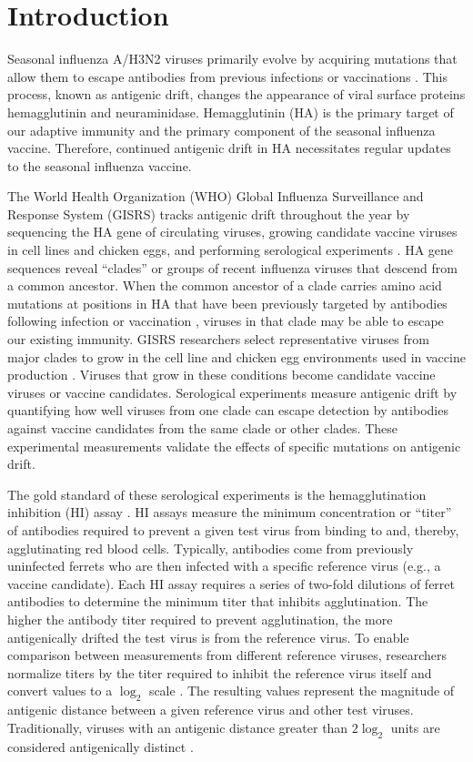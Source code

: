 \documentclass[utf8]{FrontiersinHarvard} %
\begin{document}
\section{Introduction}

Seasonal influenza A/H3N2 viruses primarily evolve by acquiring mutations that allow them to escape antibodies from previous infections or vaccinations \citep{Petrova2018}.
This process, known as antigenic drift, changes the appearance of viral surface proteins hemagglutinin and neuraminidase.
Hemagglutinin (HA) is the primary target of our adaptive immunity and the primary component of the seasonal influenza vaccine.
Therefore, continued antigenic drift in HA necessitates regular updates to the seasonal influenza vaccine.

The World Health Organization (WHO) Global Influenza Surveillance and Response System (GISRS) tracks antigenic drift throughout the year by sequencing the HA gene of circulating viruses, growing candidate vaccine viruses in cell lines and chicken eggs, and performing serological experiments \citep{Morris:2017ea}.
HA gene sequences reveal ``clades'' or groups of recent influenza viruses that descend from a common ancestor.
When the common ancestor of a clade carries amino acid mutations at positions in HA that have been previously targeted by antibodies following infection or vaccination \citep{Wolf:2006da,Shih:2007bd,Koel:2013jz}, viruses in that clade may be able to escape our existing immunity.
GISRS researchers select representative viruses from major clades to grow in the cell line and chicken egg environments used in vaccine production \citep{Katz2011}.
Viruses that grow in these conditions become candidate vaccine viruses or vaccine candidates.
Serological experiments measure antigenic drift by quantifying how well viruses from one clade can escape detection by antibodies against vaccine candidates from the same clade or other clades.
These experimental measurements validate the effects of specific mutations on antigenic drift.

The gold standard of these serological experiments is the hemagglutination inhibition (HI) assay \citep{hirst1943studies}.
HI assays measure the minimum concentration or ``titer'' of antibodies required to prevent a given test virus from binding to and, thereby, agglutinating red blood cells.
Typically, antibodies come from previously uninfected ferrets who are then infected with a specific reference virus (e.g., a vaccine candidate).
Each HI assay requires a series of two-fold dilutions of ferret antibodies to determine the minimum titer that inhibits agglutination.
The higher the antibody titer required to prevent agglutination, the more antigenically drifted the test virus is from the reference virus.
To enable comparison between measurements from different reference viruses, researchers normalize titers by the titer required to inhibit the reference virus itself and convert values to a $\log_{2}$ scale \citep{Neher:2016hy}.
The resulting values represent the magnitude of antigenic distance between a given reference virus and other test viruses.
Traditionally, viruses with an antigenic distance greater than $2\log_{2}$ units are considered antigenically distinct \citep{Katz2011}.
\end{document}
